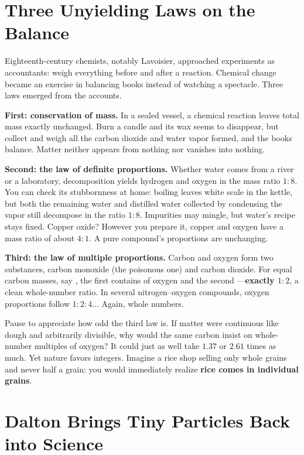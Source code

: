 \section{Three Unyielding Laws on the Balance}

Eighteenth-century chemists, notably Lavoisier, approached experiments as accountants: weigh everything before and after a reaction. Chemical change became an exercise in balancing books instead of watching a spectacle. Three laws emerged from the accounts.

\textbf{First: conservation of mass.} In a sealed vessel, a chemical reaction leaves total mass exactly unchanged. Burn a candle and its wax seems to disappear, but collect and weigh all the carbon dioxide and water vapor formed, and the books balance. Matter neither appears from nothing nor vanishes into nothing.

\textbf{Second: the law of definite proportions.} Whether water comes from a river or a laboratory, decomposition yields hydrogen and oxygen in the mass ratio $1:8$. You can check its stubbornness at home: boiling leaves white scale in the kettle, but both the remaining water and distilled water collected by condensing the vapor still decompose in the ratio $1:8$. Impurities may mingle, but water's recipe stays fixed. Copper oxide? However you prepare it, copper and oxygen have a mass ratio of about $4:1$. A pure compound's proportions are unchanging.

\textbf{Third: the law of multiple proportions.} Carbon and oxygen form two substances, carbon monoxide (the poisonous one) and carbon dioxide. For equal carbon masses, say , the first contains  of oxygen and the second ---\textbf{exactly $1:2$}, a clean whole-number ratio. In several nitrogen--oxygen compounds, oxygen proportions follow $1:2:4$... Again, whole numbers.

Pause to appreciate how odd the third law is. If matter were continuous like dough and arbitrarily divisible, why would the same carbon insist on whole-number multiples of oxygen? It could just as well take $1.37$ or $2.61$ times as much. Yet nature favors integers. Imagine a rice shop selling only whole grains and never half a grain: you would immediately realize \textbf{rice comes in individual grains}.

\section{Dalton Brings Tiny Particles Back into Science}

